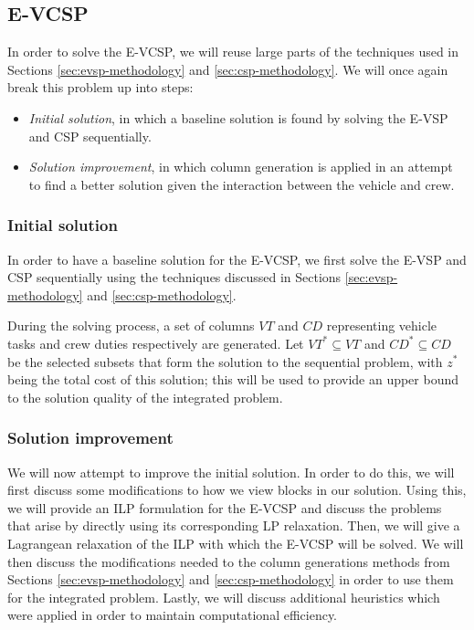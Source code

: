 \documentclass[]{article}
\begin{document}
\subsection{E-VCSP}
In order to solve the E-VCSP, we will reuse large parts of the techniques used in Sections \ref{sec:evsp-methodology} and \ref{sec:csp-methodology}. We will once again break this problem up into steps: 
\begin{itemize}
  \item \textit{Initial solution}, in which a baseline solution is found by solving the E-VSP and CSP sequentially.
  \item \textit{Solution improvement}, in which column generation is applied in an attempt to find a better solution given the interaction between the vehicle and crew.
\end{itemize}

\subsubsection{Initial solution}
In order to have a baseline solution for the E-VCSP, we first solve the E-VSP and CSP sequentially using the techniques discussed in Sections \ref{sec:evsp-methodology} and \ref{sec:csp-methodology}. 

During the solving process, a set of columns $VT$ and $CD$ representing vehicle tasks and crew duties respectively are generated. Let $VT^* \subseteq VT$ and $CD^* \subseteq CD$ be the selected subsets that form the solution to the sequential problem, with $z^*$ being the total cost of this solution; this will be used to provide an upper bound to the solution quality of the integrated problem. 

\subsubsection{Solution improvement} \label{sec:evcsp-sol-improvement}
We will now attempt to improve the initial solution. In order to do this, we will first discuss some modifications to how we view blocks in our solution. Using this, we will provide an ILP formulation for the E-VCSP and discuss the problems that arise by directly using its corresponding LP relaxation. Then, we will give a Lagrangean relaxation of the ILP with which the E-VCSP will be solved. We will then discuss the modifications needed to the column generations methods from Sections \ref{sec:evsp-methodology} and \ref{sec:csp-methodology} in order to use them for the integrated problem. Lastly, we will discuss additional heuristics which were applied in order to maintain computational efficiency. 
\end{document}
